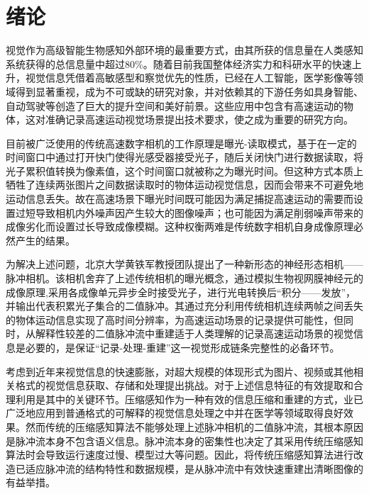 
\chapter{绪论}

视觉作为高级智能生物感知外部环境的最重要方式，由其所获的信息量在人类感知系统获得的总信息量中超过80\%\cite{Ernst2002}。随着目前我国整体经济实力和科研水平的快速上升，视觉信息凭借着高敏感型和察觉优先的性质，已经在人工智能，医学影像等领域得到显著重视，成为不可或缺的研究对象，并对依赖其的下游任务如具身智能、自动驾驶等创造了巨大的提升空间和美好前景。这些应用中包含有高速运动的物体，这对准确记录高速运动视觉场景提出技术要求，使之成为重要的研究方向。

目前被广泛使用的传统高速数字相机的工作原理是曝光-读取模式，基于在一定的时间窗口中通过打开快门使得光感受器接受光子，随后关闭快门进行数据读取，将光子累积值转换为像素值，这个时间窗口就被称之为曝光时间。但这种方式本质上牺牲了连续两张图片之间数据读取时的物体运动视觉信息，因而会带来不可避免地运动信息丢失。故在高速场景下曝光时间既可能因为满足捕捉高速运动的需要而设置过短导致相机内外噪声因产生较大的图像噪声；也可能因为满足削弱噪声带来的成像劣化而设置过长导致成像模糊。这种权衡两难是传统数字相机自身成像原理必然产生的结果。

为解决上述问题，北京大学黄铁军教授团队提出了一种新形态的神经形态相机\cite{Etienne-Cummings1996}——脉冲相机\cite{Huang_Tiejun110}。该相机舍弃了上述传统相机的曝光概念，通过模拟生物视网膜神经元的成像原理,采用各成像单元异步全时接受光子，进行光电转换后“积分——发放”，并输出代表积累光子集合的二值脉冲。其通过充分利用传统相机连续两帧之间丢失的物体运动信息实现了高时间分辨率，为高速运动场景的记录提供可能性，但同时，从解释性较差的二值脉冲流中重建适于人类理解的记录高速运动场景的视觉信息是必要的，是保证“记录-处理-重建”这一视觉形成链条完整性的必备环节。

考虑到近年来视觉信息的快速膨胀\cite{levis2024orbital}，对超大规模的体现形式为图片、视频或其他相关格式的视觉信息获取、存储和处理提出挑战。对于上述信息特征的有效提取和合理利用是其中的关键环节。压缩感知\cite{David_compress}作为一种有效的信息压缩和重建的方式，业已广泛地应用到普通格式的可解释的视觉信息处理之中并在医学等领域取得良好效果\cite{xie2022review}。然而传统的压缩感知算法不能够处理上述脉冲相机的二值脉冲流，其根本原因是脉冲流本身不包含语义信息。脉冲流本身的密集性也决定了其采用传统压缩感知算法时会导致运行速度过慢、模型过大等问题。因此，将传统压缩感知算法进行改造已适应脉冲流的结构特性和数据规模，是从脉冲流中有效快速重建出清晰图像的有益举措。

